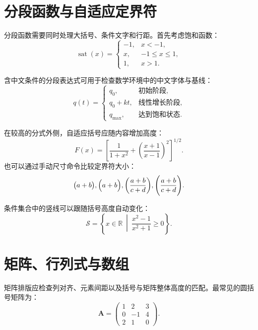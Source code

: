 \section{分段函数与自适应定界符}
\label{sec:formula-cases}

分段函数需要同时处理大括号、条件文字和行距。首先考虑饱和函数：
\begin{equation}
  \label{eq:test-cases}
  \operatorname{sat}(x)=
  \begin{cases}
    -1, & x<-1,\\
    x, & -1\le x\le 1,\\
    1, & x>1.
  \end{cases}
\end{equation}

含中文条件的分段表达式可用于检查数学环境中的中文字体与基线：
\begin{equation}
  \label{eq:test-cases-chinese}
  q(t)=
  \begin{cases}
    q_0, & \text{初始阶段},\\
    q_0+kt, & \text{线性增长阶段},\\
    q_{\max}, & \text{达到饱和状态}.
  \end{cases}
\end{equation}

在较高的分式外侧，自适应括号应随内容增加高度：
\begin{equation}
  \label{eq:test-delimiters}
  F(x)=\left[
    \frac{1}{1+x^2}
    +\left(\frac{x+1}{x-1}\right)^2
  \right]^{1/2}.
\end{equation}
也可以通过手动尺寸命令比较定界符大小：
\begin{equation}
  \label{eq:test-manual-delimiters}
  \bigl(a+b\bigr),\qquad
  \Bigl(a+b\Bigr),\qquad
  \biggl(\frac{a+b}{c+d}\biggr),\qquad
  \Biggl(\frac{a+b}{c+d}\Biggr).
\end{equation}

条件集合中的竖线可以跟随括号高度自动变化：
\begin{equation}
  \label{eq:test-middle}
  \mathcal{S}=
  \left\{x\in\mathbb{R}\ \middle|\
    \frac{x^2-1}{x^2+1}\ge 0
  \right\}.
\end{equation}

\section{矩阵、行列式与数组}
\label{sec:formula-matrix}

矩阵排版应检查列对齐、元素间距以及括号与矩阵整体高度的匹配。最常见的圆括号矩阵为：
\begin{equation}
  \label{eq:test-pmatrix}
  \boldsymbol{A}=
  \begin{pmatrix}
    1 & 2 & 3\\
    0 & -1 & 4\\
    2 & 1 & 0
  \end{pmatrix}.
\end{equation}

